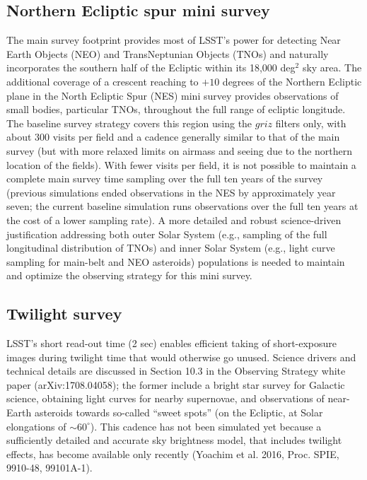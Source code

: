 \documentclass[DM,lsstdraft,toc,usenatbib]{lsstdoc}
\begin{document}
\subsection{Northern Ecliptic spur mini survey}

The main survey footprint provides most of LSST's power for detecting Near Earth Objects (NEO) and 
TransNeptunian Objects (TNOs) and naturally incorporates the southern half of the Ecliptic within its 
18,000 deg$^2$ sky area. The additional coverage of a crescent reaching to $+10$ degrees of the Northern Ecliptic 
plane in the North Ecliptic Spur (NES) mini survey provides observations of small bodies, particular TNOs, 
throughout the full range of ecliptic longitude. The baseline survey strategy covers this region using the 
$griz$ filters only, with about 300 visits per field and a cadence generally similar to that of the main survey
(but with more relaxed limits on airmass and seeing due to the northern location of the fields). With fewer visits per field,
it is not possible to maintain a complete main survey time sampling over the full ten years of the survey (previous
simulations ended observations in the NES by approximately year seven; the current baseline simulation runs 
observations over the full ten years at the cost of a lower sampling rate). 
A more detailed  and robust science-driven justification addressing both outer Solar System (e.g., sampling
of the full longitudinal distribution of TNOs) and inner Solar System (e.g., light curve sampling for main-belt 
and NEO asteroids) populations is needed to maintain and optimize the observing strategy for this
mini survey.  


\subsection{Twilight survey \label{sec:twilight}} 

LSST's short read-out time (2 sec) enables efficient taking of short-exposure images during twilight time 
that would otherwise go unused. Science drivers and technical details are discussed in Section 10.3 in the 
Observing Strategy white paper (arXiv:1708.04058); the former include a bright star survey for Galactic
science, obtaining light curves for nearby supernovae, and observations of near-Earth asteroids towards
so-called ``sweet spots'' (on the Ecliptic, at Solar elongations of $\sim60^\circ$). This cadence has not 
been simulated yet because a sufficiently detailed and accurate sky brightness model, that includes twilight 
effects, has become available only recently (Yoachim et al. 2016, Proc. SPIE, 9910-48, 99101A-1). 
\end{document}
